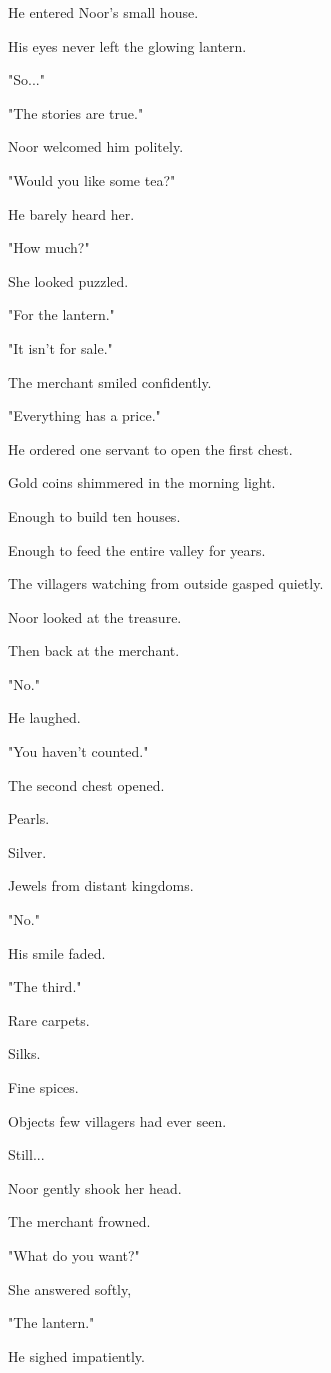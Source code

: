 \documentclass[12pt,openany]{book}
\begin{document}
He entered Noor's small house.

His eyes never left the glowing lantern.

"So..."

"The stories are true."

Noor welcomed him politely.

"Would you like some tea?"

He barely heard her.

"How much?"

She looked puzzled.

"For the lantern."

"It isn't for sale."

The merchant smiled confidently.

"Everything has a price."

He ordered one servant to open the first chest.

Gold coins shimmered in the morning light.

Enough to build ten houses.

Enough to feed the entire valley for years.

The villagers watching from outside gasped quietly.

Noor looked at the treasure.

Then back at the merchant.

"No."

He laughed.

"You haven't counted."

The second chest opened.

Pearls.

Silver.

Jewels from distant kingdoms.

"No."

His smile faded.

"The third."

Rare carpets.

Silks.

Fine spices.

Objects few villagers had ever seen.

Still...

Noor gently shook her head.

The merchant frowned.

"What do you want?"

She answered softly,

"The lantern."

He sighed impatiently.
\end{document}
